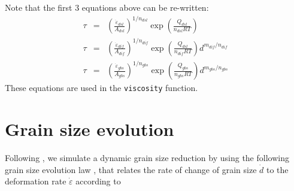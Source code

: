 \documentclass[a4paper]{article}
\begin{document}
Note that the first 3 equations above can be re-written:
\begin{eqnarray}
\tau &=& \left(\frac{\dot{\varepsilon}_{dsl}}{A_{dsl}} \right)^{1/n_{dsl}} \exp\left(\frac{Q_{dsl}}{n_{dsl}RT} \right) \\ 
\tau &=& \left(\frac{\dot{\varepsilon}_{dif}}{A_{dif}} \right)^{1/n_{dif}} \exp\left(\frac{Q_{dsl}}{n_{dif}RT} \right) d^{m_{dif}/n_{dif}} \\
\tau &=& \left(\frac{\dot{\varepsilon}_{gbs}}{A_{gbs}} \right)^{1/n_{gbs}} \exp\left(\frac{Q_{gbs}}{n_{gbs}RT} \right) d^{m_{gbs}/n_{gbs}} 
\end{eqnarray}
These equations are used in the \lstinline{viscosity} function. 


\section{Grain size evolution \label{seq:gsev}}

Following \textcite{prgu09}, we simulate a dynamic grain size reduction
by using the following grain size evolution law \textcite{brcp99}, that relates
the rate of change of grain size $\dot{d}$ to the 
deformation rate $\dot{\varepsilon}$ according to
\end{document}
